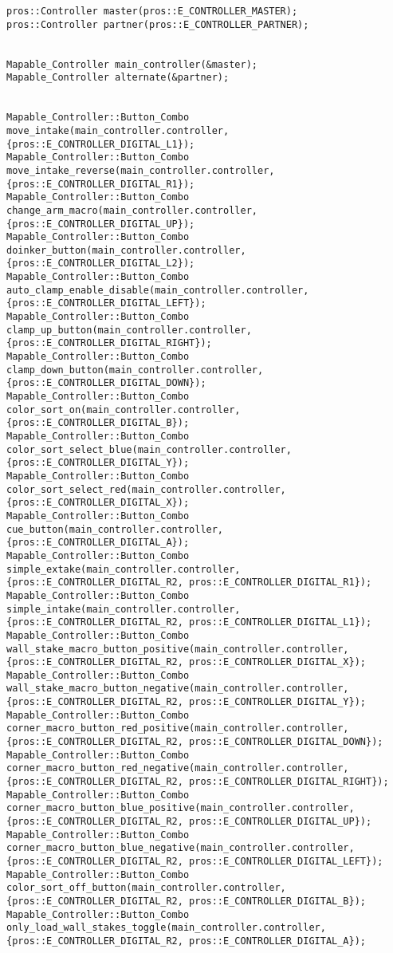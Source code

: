 \begin{verbatim}
pros::Controller master(pros::E_CONTROLLER_MASTER);
pros::Controller partner(pros::E_CONTROLLER_PARTNER);


Mapable_Controller main_controller(&master);
Mapable_Controller alternate(&partner);


Mapable_Controller::Button_Combo move_intake(main_controller.controller, {pros::E_CONTROLLER_DIGITAL_L1});
Mapable_Controller::Button_Combo move_intake_reverse(main_controller.controller, {pros::E_CONTROLLER_DIGITAL_R1});
Mapable_Controller::Button_Combo change_arm_macro(main_controller.controller, {pros::E_CONTROLLER_DIGITAL_UP});
Mapable_Controller::Button_Combo doinker_button(main_controller.controller, {pros::E_CONTROLLER_DIGITAL_L2});
Mapable_Controller::Button_Combo auto_clamp_enable_disable(main_controller.controller, {pros::E_CONTROLLER_DIGITAL_LEFT});
Mapable_Controller::Button_Combo clamp_up_button(main_controller.controller, {pros::E_CONTROLLER_DIGITAL_RIGHT});
Mapable_Controller::Button_Combo clamp_down_button(main_controller.controller, {pros::E_CONTROLLER_DIGITAL_DOWN});
Mapable_Controller::Button_Combo color_sort_on(main_controller.controller,{pros::E_CONTROLLER_DIGITAL_B});
Mapable_Controller::Button_Combo color_sort_select_blue(main_controller.controller, {pros::E_CONTROLLER_DIGITAL_Y});
Mapable_Controller::Button_Combo color_sort_select_red(main_controller.controller, {pros::E_CONTROLLER_DIGITAL_X});
Mapable_Controller::Button_Combo cue_button(main_controller.controller, {pros::E_CONTROLLER_DIGITAL_A});
Mapable_Controller::Button_Combo simple_extake(main_controller.controller, {pros::E_CONTROLLER_DIGITAL_R2, pros::E_CONTROLLER_DIGITAL_R1});
Mapable_Controller::Button_Combo simple_intake(main_controller.controller, {pros::E_CONTROLLER_DIGITAL_R2, pros::E_CONTROLLER_DIGITAL_L1});
Mapable_Controller::Button_Combo wall_stake_macro_button_positive(main_controller.controller, {pros::E_CONTROLLER_DIGITAL_R2, pros::E_CONTROLLER_DIGITAL_X});
Mapable_Controller::Button_Combo wall_stake_macro_button_negative(main_controller.controller, {pros::E_CONTROLLER_DIGITAL_R2, pros::E_CONTROLLER_DIGITAL_Y});
Mapable_Controller::Button_Combo corner_macro_button_red_positive(main_controller.controller, {pros::E_CONTROLLER_DIGITAL_R2, pros::E_CONTROLLER_DIGITAL_DOWN});
Mapable_Controller::Button_Combo corner_macro_button_red_negative(main_controller.controller, {pros::E_CONTROLLER_DIGITAL_R2, pros::E_CONTROLLER_DIGITAL_RIGHT});
Mapable_Controller::Button_Combo corner_macro_button_blue_positive(main_controller.controller, {pros::E_CONTROLLER_DIGITAL_R2, pros::E_CONTROLLER_DIGITAL_UP});
Mapable_Controller::Button_Combo corner_macro_button_blue_negative(main_controller.controller, {pros::E_CONTROLLER_DIGITAL_R2, pros::E_CONTROLLER_DIGITAL_LEFT});
Mapable_Controller::Button_Combo color_sort_off_button(main_controller.controller, {pros::E_CONTROLLER_DIGITAL_R2, pros::E_CONTROLLER_DIGITAL_B});
Mapable_Controller::Button_Combo only_load_wall_stakes_toggle(main_controller.controller, {pros::E_CONTROLLER_DIGITAL_R2, pros::E_CONTROLLER_DIGITAL_A});



\end{verbatim}
